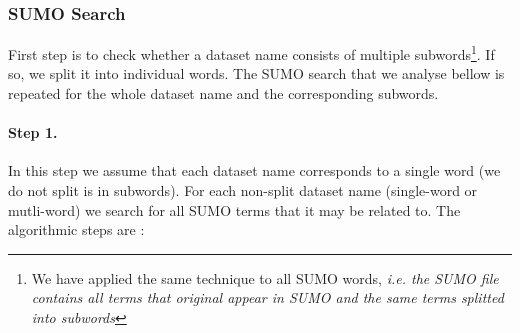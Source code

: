 \documentclass[a4paper,10pt]{article}
\begin{document}












\subsubsection{SUMO Search}
First step is to check whether a dataset name consists of multiple subwords\footnote{We have applied the same technique to all SUMO words, \textit{i.e. the SUMO file contains all terms that original appear in SUMO and the same terms splitted into subwords}}. 
If so, we split it into individual words. The SUMO search 
that we analyse bellow is repeated for the whole dataset name and the corresponding subwords.

\paragraph{Step 1.}\label{step1} In this step we assume that each dataset name corresponds to a single word (we do not split is in subwords).  
For each non-split dataset name (single-word or mutli-word) we search for all SUMO terms that it may be related to.    
The algorithmic steps are :
\end{document}
